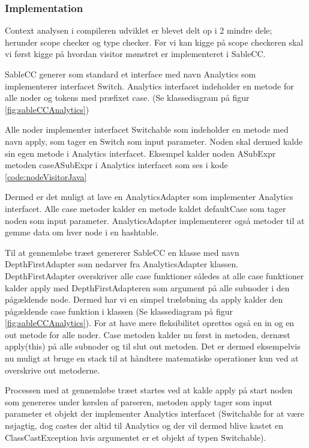 \subsubsection{Implementation}
Context analysen i compileren udviklet er blevet delt op i 2 mindre dele; herunder scope checker og type checker. Før vi kan kigge på scope checkeren skal vi først kigge på hvordan visitor mønstret er implementeret i SableCC.

\label{sct:visitorSableCC}
SableCC generer som standard et interface med navn Analytics som implementerer interfacet Switch. Analytics interfacet indeholder en metode for alle noder og tokens med præfixet case. (Se klassediagram på figur \ref{fig:sableCCAnalytics})

Alle noder implementer interfacet Switchable som indeholder en metode med navn apply, som tager en Switch som input parameter. Noden skal dermed kalde sin egen metode i Analytics interfacet. Eksempel kalder noden ASubExpr metoden caseASubExpr i Analytics interfacet som ses i kode \ref{code:nodeVisitorJava}


\noindent Dermed er det muligt at lave en AnalyticsAdapter som implementer Analytics interfacet. Alle case metoder kalder en metode kaldet defaultCase som tager noden som input parameter. AnalyticsAdapter implementerer også metoder til at gemme data om hver node i en hashtable. 

Til at gennemløbe træet genererer SableCC en klasse med navn DepthFirstAdapter som nedarver fra AnalyticsAdapter klassen. DepthFirstAdapter overskriver alle case funktioner således at alle case funktioner kalder apply med DepthFirstAdapteren som argument på alle subnoder i den pågældende node. Dermed har vi en simpel træløbning da apply kalder den pågældende case funktion i klassen (Se klassediagram på figur \ref{fig:sableCCAnalytics}). For at have mere fleksibilitet oprettes også en in og en out metode for alle noder. Case metoden kalder nu først in metoden, dernæst apply(this) på alle subnoder og til slut out metoden. Det er dermed eksempelvis nu muligt at bruge en stack til at håndtere matematiske operationer kun ved at overskrive out metoderne.

Processen med at gennemløbe træet startes ved at kalde apply på start noden som genereres under kørslen af parseren, metoden apply tager som input parameter et objekt der implementer Analytics interfacet (Switchable for at være nøjagtig, dog castes der altid til Analytics og der vil dermed blive kastet en ClassCastException hvis argumentet er et objekt af typen Switchable).

